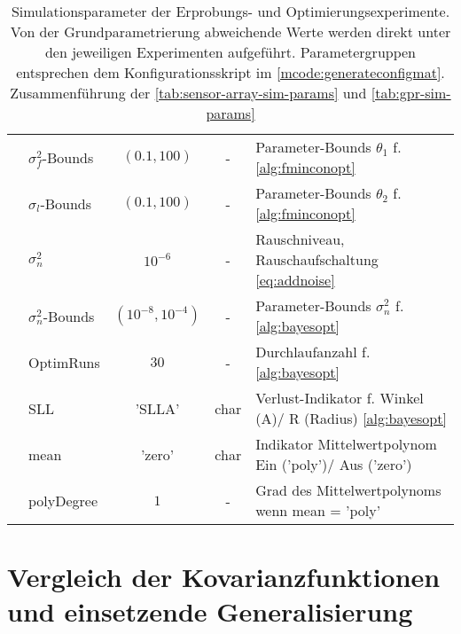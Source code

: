 \begin{table}[htp]
{\begin{tabular}{l l c c l}
			                                         & $\sigma_f^2$-Bounds & $(0.1, 100)$         & -                 & Parameter-Bounds $\theta_1$ f. \autoref{alg:fminconopt}             \\
			                                         & $\sigma_l$-Bounds   & $(0.1, 100)$         & -                 & Parameter-Bounds $\theta_2$ f. \autoref{alg:fminconopt}             \\
			                                         & $\sigma_n^2$        & $10^{-6}$            & -                 & Rauschniveau, Rauschaufschaltung \eqref{eq:addnoise}                \\
			                                         & $\sigma_n^2$-Bounds & $(10^{-8}, 10^{-4})$ & -                 & Parameter-Bounds $\sigma_n^2$ f. \autoref{alg:bayesopt}             \\
			                                         & OptimRuns           & $30$                 & -                 & Durchlaufanzahl f. \autoref{alg:bayesopt}                           \\
			                                         & SLL                 & 'SLLA'               & char              & Verlust-Indikator f. Winkel (A)/ R (Radius) \autoref{alg:bayesopt}  \\
			                                         & mean                & 'zero'               & char              & Indikator Mittelwertpolynom Ein ('poly')/ Aus ('zero')              \\
			                                         & polyDegree          & $1$                  & -                 & Grad des Mittelwertpolynoms wenn mean = 'poly'                      \\ \bottomrule
		\end{tabular}}
	\caption[Simulationsparameter der Erprobungs- und Optimierungsexperimente]{Simulationsparameter der Erprobungs- und Optimierungsexperimente. Von der Grundparametrierung abweichende Werte werden direkt unter den jeweiligen Experimenten aufgeführt. Parametergruppen entsprechen dem Konfigurationsskript im \autoref{mcode:generateconfigmat}. Zusammenführung der \autoref{tab:sensor-array-sim-params} und \autoref{tab:gpr-sim-params}}
	\label{tab:sim-params-exp}
\end{table}

	
\section{Vergleich der Kovarianzfunktionen und einsetzende Generalisierung}\label{sec:exp1}

